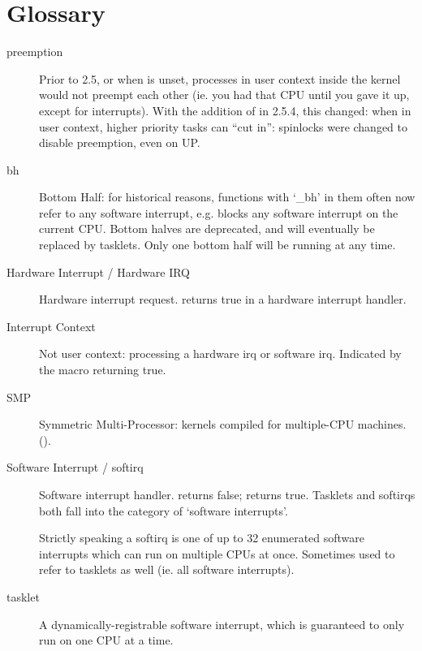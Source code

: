 \documentclass[a4paper,8pt,english]{sphinxmanual}
\begin{document}
\section{Glossary}
\label{kernel-hacking/locking:glossary}\begin{description}
\item[{preemption}] \leavevmode
Prior to 2.5, or when  is unset, processes in user
context inside the kernel would not preempt each other (ie. you had that
CPU until you gave it up, except for interrupts). With the addition of
 in 2.5.4, this changed: when in user context, higher
priority tasks can ``cut in'': spinlocks were changed to disable
preemption, even on UP.

\item[{bh}] \leavevmode
Bottom Half: for historical reasons, functions with `\_bh' in them often
now refer to any software interrupt, e.g. 
blocks any software interrupt on the current CPU. Bottom halves are
deprecated, and will eventually be replaced by tasklets. Only one bottom
half will be running at any time.

\item[{Hardware Interrupt / Hardware IRQ}] \leavevmode
Hardware interrupt request.  returns true in a
hardware interrupt handler.

\item[{Interrupt Context}] \leavevmode
Not user context: processing a hardware irq or software irq. Indicated
by the  macro returning true.

\item[{SMP}] \leavevmode
Symmetric Multi-Processor: kernels compiled for multiple-CPU machines.
().

\item[{Software Interrupt / softirq}] \leavevmode
Software interrupt handler.  returns false;
 returns true. Tasklets and softirqs both
fall into the category of `software interrupts'.

Strictly speaking a softirq is one of up to 32 enumerated software
interrupts which can run on multiple CPUs at once. Sometimes used to
refer to tasklets as well (ie. all software interrupts).

\item[{tasklet}] \leavevmode
A dynamically-registrable software interrupt, which is guaranteed to
only run on one CPU at a time.


\end{description}
\end{document}

